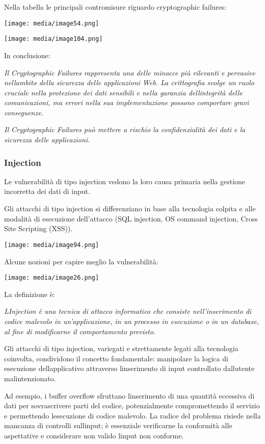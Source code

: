 Nella tabella le principali contromisure riguardo cryptographic
failures:

\texttt{[image: media/image54.png]}

\texttt{[image: media/image104.png]}

In conclusione:

\emph{Il Cryptographic Failures rappresenta una delle minacce più
rilevanti e pervasive nell\textquotesingle ambito della sicurezza delle
applicazioni Web. La crittografia svolge un ruolo cruciale nella
protezione dei dati sensibili e nella garanzia
dell\textquotesingle integrità delle comunicazioni, ma errori nella sua
implementazione possono comportare gravi conseguenze.}

\emph{Il Cryptographic Failures può mettere a rischio la confidenzialità
dei dati e la sicurezza delle applicazioni.}

\subsubsection{Injection}\label{injection}

Le vulnerabilità di tipo injection vedono la loro causa primaria nella
gestione incorretta dei dati di input.

Gli attacchi di tipo injection si differenziano in base alla tecnologia
colpita e alle modalità di esecuzione dell'attacco (SQL injection, OS
command injection, Cross Site Scripting (XSS)).

\texttt{[image: media/image94.png]}

Alcune nozioni per capire meglio la vulnerabilità:

\texttt{[image: media/image26.png]}

La definizione è:

\emph{L\textquotesingle Injection è una tecnica di attacco informatico
che consiste nell'inserimento di codice malevolo in un'applicazione, in
un processo in esecuzione o in un database, al fine di modificarne il
comportamento previsto.}

Gli attacchi di tipo injection, variegati e strettamente legati alla
tecnologia coinvolta, condividono il concetto fondamentale: manipolare
la logica di esecuzione dell\textquotesingle applicativo attraverso
l\textquotesingle inserimento di input controllato
dall\textquotesingle utente malintenzionato.

Ad esempio, i buffer overflow sfruttano l\textquotesingle inserimento di
una quantità eccessiva di dati per sovrascrivere parti del codice,
potenzialmente compromettendo il servizio e permettendo
l\textquotesingle esecuzione di codice malevolo. La radice del problema
risiede nella mancanza di controlli sull\textquotesingle input; è
essenziale verificarne la conformità alle aspettative e considerare non
valido l\textquotesingle input non conforme.

